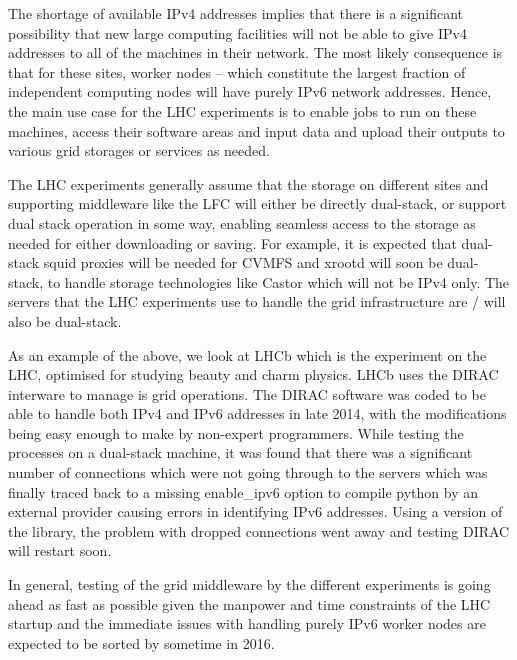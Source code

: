 

The shortage of available IPv4 addresses implies that there is a significant possibility that new large
computing facilities will not be able to give IPv4 addresses to all of the machines in their network. The
most likely consequence is that for these sites, worker nodes -- which constitute the largest fraction of
independent computing nodes will have purely IPv6 network addresses. Hence, the main use case for the LHC
experiments is to enable jobs to run on these machines, access their software areas and input data and
upload their outputs to various grid storages or services as needed.

The LHC experiments generally assume \cite{LHCassumption} that the storage on different sites and
supporting middleware \cite{middleware} like the LFC will either be directly dual-stack, or support
dual stack operation in some way, enabling seamless access to the storage as needed for either downloading
or saving. For example, it is expected that dual-stack squid proxies will be needed for CVMFS and xrootd
will soon be dual-stack, to handle storage technologies like Castor which will not be IPv4 only. The
servers that the LHC experiments use to handle the grid infrastructure are / will also be dual-stack.

As an example of the above, we look at LHCb \cite{LHCb} which is the experiment on the LHC, optimised
for studying beauty and charm physics. LHCb uses the DIRAC \cite{DIRAC}interware to manage is grid
operations. The DIRAC software was coded to be able to handle both IPv4 and IPv6 addresses in late 2014,
with the modifications being easy enough to make by non-expert programmers. While testing the processes
on a dual-stack machine, it was found that there was a significant number of connections which were not
going through to the servers which was finally traced back to a missing enable\_ipv6 option to compile python
by an external provider causing errors in identifying IPv6 addresses. Using a version of the library, the
problem with dropped connections went away and testing DIRAC will restart soon.

In general, testing of the grid middleware by the different experiments is going ahead as fast as possible
given the manpower and time constraints of the LHC startup and the immediate issues with handling purely
IPv6 worker nodes are expected to be sorted by sometime in 2016.


